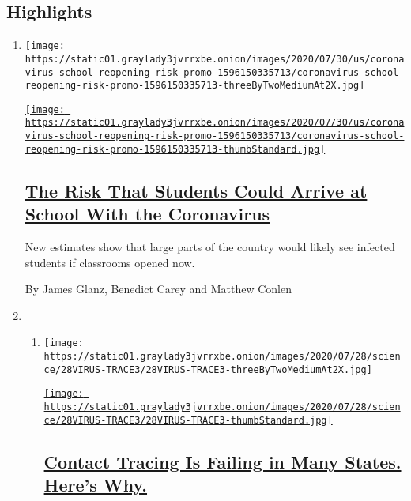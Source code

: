 \hypertarget{highlights}{%
\subsection{Highlights}\label{highlights}}

\begin{enumerate}
\def\labelenumi{\arabic{enumi}.}
\item
  \texttt{[image: https://static01.graylady3jvrrxbe.onion/images/2020/07/30/us/coronavirus-school-reopening-risk-promo-1596150335713/coronavirus-school-reopening-risk-promo-1596150335713-threeByTwoMediumAt2X.jpg]}

  \href{/interactive/2020/07/31/us/coronavirus-school-reopening-risk.html}{\texttt{[image: https://static01.graylady3jvrrxbe.onion/images/2020/07/30/us/coronavirus-school-reopening-risk-promo-1596150335713/coronavirus-school-reopening-risk-promo-1596150335713-thumbStandard.jpg]}}

  \hypertarget{the-risk-that-students-could-arrive-at-school-with-the-coronavirus}{%
  \subsection{\texorpdfstring{\href{/interactive/2020/07/31/us/coronavirus-school-reopening-risk.html}{The
  Risk That Students Could Arrive at School With the
  Coronavirus}}{The Risk That Students Could Arrive at School With the Coronavirus}}\label{the-risk-that-students-could-arrive-at-school-with-the-coronavirus}}

  New estimates show that large parts of the country would likely see
  infected students if classrooms opened now.

  By James Glanz, Benedict Carey and Matthew Conlen
\item
  \begin{enumerate}
  \def\labelenumii{\arabic{enumii}.}
  \item
    \texttt{[image: https://static01.graylady3jvrrxbe.onion/images/2020/07/28/science/28VIRUS-TRACE3/28VIRUS-TRACE3-threeByTwoMediumAt2X.jpg]}

    \href{/2020/07/31/health/covid-contact-tracing-tests.html}{\texttt{[image: https://static01.graylady3jvrrxbe.onion/images/2020/07/28/science/28VIRUS-TRACE3/28VIRUS-TRACE3-thumbStandard.jpg]}}

    \hypertarget{contact-tracing-is-failing-in-many-states-heres-why}{%
    \subsection{\texorpdfstring{\href{/2020/07/31/health/covid-contact-tracing-tests.html}{Contact
    Tracing Is Failing in Many States. Here's
    Why.}}{Contact Tracing Is Failing in Many States. Here's Why.}}\label{contact-tracing-is-failing-in-many-states-heres-why}}


\end{enumerate}
\end{enumerate}
